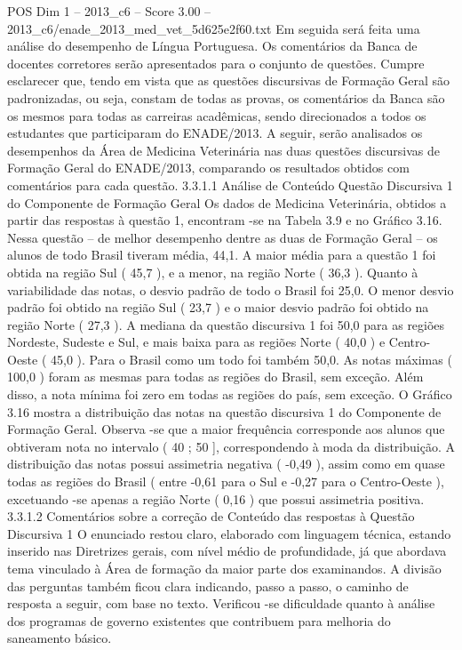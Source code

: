 \begin{textsample}{POS Dim 1 – 2013\_c6 – Score 3.00 – 2013\_c6/enade\_2013\_med\_vet\_5d625e2f60.txt}
Em seguida será feita uma análise do desempenho de Língua Portuguesa.
Os comentários da Banca de docentes corretores serão apresentados para o conjunto de questões.
Cumpre esclarecer que, tendo em vista que as questões discursivas de Formação Geral são padronizadas, ou seja, constam de todas as provas, os comentários da Banca são os mesmos para todas as carreiras acadêmicas, sendo direcionados a todos os estudantes que participaram do ENADE/2013.
A seguir, serão analisados os desempenhos da Área de Medicina Veterinária nas duas questões discursivas de Formação Geral do ENADE/2013, comparando os resultados obtidos com comentários para cada questão. 3.3.1.1 Análise de Conteúdo Questão Discursiva 1 do Componente de Formação Geral Os dados de Medicina Veterinária, obtidos a partir das respostas à questão 1, encontram -se na Tabela 3.9 e no Gráfico 3.16.
Nessa questão – de melhor desempenho dentre as duas de Formação Geral – os alunos de todo Brasil tiveram média, 44,1.
A maior média para a questão 1 foi obtida na região Sul ( 45,7 ), e a menor, na região Norte ( 36,3 ).
Quanto à variabilidade das notas, o desvio padrão de todo o Brasil foi 25,0.
O menor desvio padrão foi obtido na região Sul ( 23,7 ) e o maior desvio padrão foi obtido na região Norte ( 27,3 ).
A mediana da questão discursiva 1 foi 50,0 para as regiões Nordeste, Sudeste e Sul, e mais baixa para as regiões Norte ( 40,0 ) e Centro-Oeste ( 45,0 ).
Para o Brasil como um todo foi também 50,0.
As notas máximas ( 100,0 ) foram as mesmas para todas as regiões do Brasil, sem exceção.
Além disso, a nota mínima foi zero em todas as regiões do país, sem exceção.
O Gráfico 3.16 mostra a distribuição das notas na questão discursiva 1 do Componente de Formação Geral.
Observa -se que a maior frequência corresponde aos alunos que obtiveram nota no intervalo ( 40 ; 50 ], correspondendo à moda da distribuição.
A distribuição das notas possui assimetria negativa ( -0,49 ), assim como em quase todas as regiões do Brasil ( entre -0,61 para o Sul e -0,27 para o Centro-Oeste ), excetuando -se apenas a região Norte ( 0,16 ) que possui assimetria positiva. 3.3.1.2 Comentários sobre a correção de Conteúdo das respostas à Questão Discursiva 1 O enunciado restou claro, elaborado com linguagem técnica, estando inserido nas Diretrizes gerais, com nível médio de profundidade, já que abordava tema vinculado à Área de formação da maior parte dos examinandos.
A divisão das perguntas também ficou clara indicando, passo a passo, o caminho de resposta a seguir, com base no texto.
Verificou -se dificuldade quanto à análise dos programas de governo existentes que contribuem para melhoria do saneamento básico.

\end{textsample}
